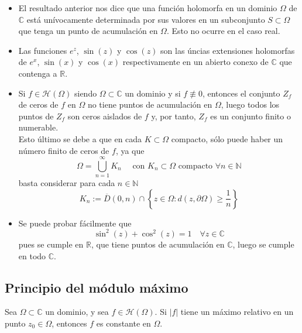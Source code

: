 \begin{observación}
    \vspace{-2em}
    \begin{itemize}
        \item El resultado anterior nos dice que una función holomorfa en un dominio $\Omega$ de $\mathbb{C}$ está unívocamente determinada por sus valores en un subconjunto $S \subset \Omega$ que tenga un punto de acumulación en $\Omega$. Esto no ocurre en el caso real.
        \item Las funciones $e^{z}$, $\sin(z)$ y $\cos(z)$ son las úncias extensiones holomorfas de $e^{x}$, $\sin(x)$ y $\cos(x)$ respectivamente en un abierto conexo de $\mathbb{C}$ que contenga a $\mathbb{R}$.
        \item Si $f \in \mathcal{H}(\Omega)$ siendo $\Omega \subset \mathbb{C}$ un dominio y si $f \not\equiv  0$, entonces el conjunto $Z_f$ de ceros de $f$ en $\Omega$ no tiene puntos de acumulación en $\Omega$, luego todos los puntos de $Z_f$ son ceros aislados de $f$ y, por tanto, $Z_f$ es un conjunto finito o numerable.\\
        Esto último se debe a que en cada $K \subset \Omega$ compacto, sólo puede haber un número finito de ceros de $f$, ya que
        \[
            \Omega = \bigcup_{n=1}^{\infty} K_n \quad \text{ con } K_n \subset \Omega \text{ compacto } \forall n \in \mathbb{N}
        \]
        basta considerar para cada $n \in \mathbb{N}$
        \[
            K_n := \overline{D}(0,n) \cap \left\{ z \in \Omega : d(z, \partial \Omega) \geq \frac{1}{n} \right\}
        \]
        \item Se puede probar fácilmente que 
        \[
            \sin^2(z) + \cos^2(z) = 1 \quad \forall z \in \mathbb{C}
        \]
        pues se cumple en $\mathbb{R}$, que tiene puntos de acumulación en $\mathbb{C}$, luego se cumple en todo $\mathbb{C}$.
    \end{itemize}
\end{observación}

\subsection{Principio del módulo máximo}

\begin{teorema} 
    Sea $\Omega \subset \mathbb{C}$ un dominio, y sea $f \in \mathcal{H}(\Omega)$. Si $|f|$ tiene un máximo relativo en un punto $z_0 \in \Omega$, entonces $f$ es constante en $\Omega$.
\end{teorema}

